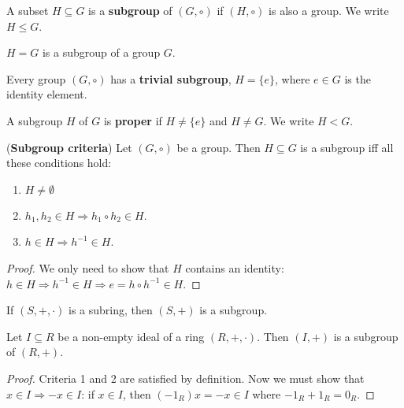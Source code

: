 \begin{definition}
	A subset $H \subseteq G$ is a \textbf{subgroup} of $(G, \circ)$ if $(H, \circ)$ is also a group. We write $H \le G$.
\end{definition}

\begin{remark}
	$H = G$ is a subgroup of a group $G$.
\end{remark}

\begin{definition}
	Every group $(G, \circ)$ has a \textbf{trivial subgroup}, $H = \{ e \}$, where $e \in G$ is the identity element.
\end{definition}

\begin{definition}
	A subgroup $H$ of $G$ is \textbf{proper} if $H \ne \{ e \}$ and $H \ne G$. We write $H < G$.
\end{definition}

\begin{proposition}
	(\textbf{Subgroup criteria}) Let $(G, \circ)$ be a group. Then $H \subseteq G$ is a subgroup iff all these conditions hold:
	\begin{enumerate}
		\item $H \ne \emptyset$
		\item $h_1, h_2 \in H \Rightarrow h_1 \circ h_2 \in H$.
		\item $h \in H \Rightarrow h^{-1} \in H$.
	\end{enumerate}
\end{proposition}

\begin{proof}
	We only need to show that $H$ contains an identity: $h \in H \Rightarrow h^{-1} \in H \Rightarrow e = h \circ h^{-1} \in H$.
\end{proof}

\begin{example}
	If $(S, +, \cdot)$ is a subring, then $(S, +)$ is a subgroup.
\end{example}

\begin{proposition}
	Let $I \subseteq R$ be a non-empty ideal of a ring $(R, +, \cdot)$. Then $(I, +)$ is a subgroup of $(R, +)$.
\end{proposition}

\begin{proof}
	Criteria 1 and 2 are satisfied by definition. Now we must show that $x \in I \Rightarrow -x \in I$: if $x \in I$, then $(-1_R) x = -x \in I$ where $-1_R + 1_R = 0_R$.
\end{proof}

